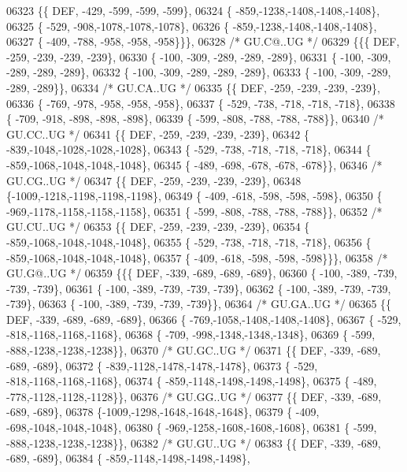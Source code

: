 \begin{DoxyCode}
06323 \{\{  DEF, -429, -599, -599, -599\},
06324 \{ -859,-1238,-1408,-1408,-1408\},
06325 \{ -529, -908,-1078,-1078,-1078\},
06326 \{ -859,-1238,-1408,-1408,-1408\},
06327 \{ -409, -788, -958, -958, -958\}\}\},
06328 \textcolor{comment}{/* GU.C@..UG */}
06329 \{\{\{  DEF, -259, -239, -239, -239\},
06330 \{ -100, -309, -289, -289, -289\},
06331 \{ -100, -309, -289, -289, -289\},
06332 \{ -100, -309, -289, -289, -289\},
06333 \{ -100, -309, -289, -289, -289\}\},
06334 \textcolor{comment}{/* GU.CA..UG */}
06335 \{\{  DEF, -259, -239, -239, -239\},
06336 \{ -769, -978, -958, -958, -958\},
06337 \{ -529, -738, -718, -718, -718\},
06338 \{ -709, -918, -898, -898, -898\},
06339 \{ -599, -808, -788, -788, -788\}\},
06340 \textcolor{comment}{/* GU.CC..UG */}
06341 \{\{  DEF, -259, -239, -239, -239\},
06342 \{ -839,-1048,-1028,-1028,-1028\},
06343 \{ -529, -738, -718, -718, -718\},
06344 \{ -859,-1068,-1048,-1048,-1048\},
06345 \{ -489, -698, -678, -678, -678\}\},
06346 \textcolor{comment}{/* GU.CG..UG */}
06347 \{\{  DEF, -259, -239, -239, -239\},
06348 \{-1009,-1218,-1198,-1198,-1198\},
06349 \{ -409, -618, -598, -598, -598\},
06350 \{ -969,-1178,-1158,-1158,-1158\},
06351 \{ -599, -808, -788, -788, -788\}\},
06352 \textcolor{comment}{/* GU.CU..UG */}
06353 \{\{  DEF, -259, -239, -239, -239\},
06354 \{ -859,-1068,-1048,-1048,-1048\},
06355 \{ -529, -738, -718, -718, -718\},
06356 \{ -859,-1068,-1048,-1048,-1048\},
06357 \{ -409, -618, -598, -598, -598\}\}\},
06358 \textcolor{comment}{/* GU.G@..UG */}
06359 \{\{\{  DEF, -339, -689, -689, -689\},
06360 \{ -100, -389, -739, -739, -739\},
06361 \{ -100, -389, -739, -739, -739\},
06362 \{ -100, -389, -739, -739, -739\},
06363 \{ -100, -389, -739, -739, -739\}\},
06364 \textcolor{comment}{/* GU.GA..UG */}
06365 \{\{  DEF, -339, -689, -689, -689\},
06366 \{ -769,-1058,-1408,-1408,-1408\},
06367 \{ -529, -818,-1168,-1168,-1168\},
06368 \{ -709, -998,-1348,-1348,-1348\},
06369 \{ -599, -888,-1238,-1238,-1238\}\},
06370 \textcolor{comment}{/* GU.GC..UG */}
06371 \{\{  DEF, -339, -689, -689, -689\},
06372 \{ -839,-1128,-1478,-1478,-1478\},
06373 \{ -529, -818,-1168,-1168,-1168\},
06374 \{ -859,-1148,-1498,-1498,-1498\},
06375 \{ -489, -778,-1128,-1128,-1128\}\},
06376 \textcolor{comment}{/* GU.GG..UG */}
06377 \{\{  DEF, -339, -689, -689, -689\},
06378 \{-1009,-1298,-1648,-1648,-1648\},
06379 \{ -409, -698,-1048,-1048,-1048\},
06380 \{ -969,-1258,-1608,-1608,-1608\},
06381 \{ -599, -888,-1238,-1238,-1238\}\},
06382 \textcolor{comment}{/* GU.GU..UG */}
06383 \{\{  DEF, -339, -689, -689, -689\},
06384 \{ -859,-1148,-1498,-1498,-1498\},

\end{DoxyCode}
